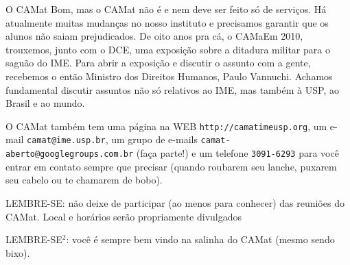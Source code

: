 \begin{secao}{O CAMat}
Bom, mas o CAMat não é e nem deve ser feito só de serviços. Há atualmente muitas mudanças no nosso instituto e precisamos garantir que os alunos não saiam prejudicados. De oito anos pra cá, o CAMaEm 2010, trouxemos, junto com o DCE, uma exposição sobre a ditadura militar para o saguão do IME. Para abrir a exposição e discutir o assunto com a gente, recebemos o então Ministro dos Direitos Humanos, Paulo Vannuchi. Achamos fundamental discutir assuntos não só relativos ao IME, mas também à USP, ao Brasil e ao mundo. 
 

O CAMat também tem uma página na WEB {\tt http://camatimeusp.org}, um e-mail {\tt camat@ime.usp.br}, um grupo de e-mails {\tt camat-aberto@googlegroups.com.br} (faça parte!) e um telefone {\tt 3091-6293} para você entrar em contato sempre que precisar (quando roubarem seu lanche, puxarem seu cabelo ou te
chamarem de bobo).

LEMBRE-SE: não deixe de participar (ao menos para conhecer) das reuniões do CAMat. Local e horários serão propriamente divulgados

LEMBRE-SE$^2$: você é sempre bem vindo na salinha do CAMat (mesmo sendo bixo).

\end{secao}
